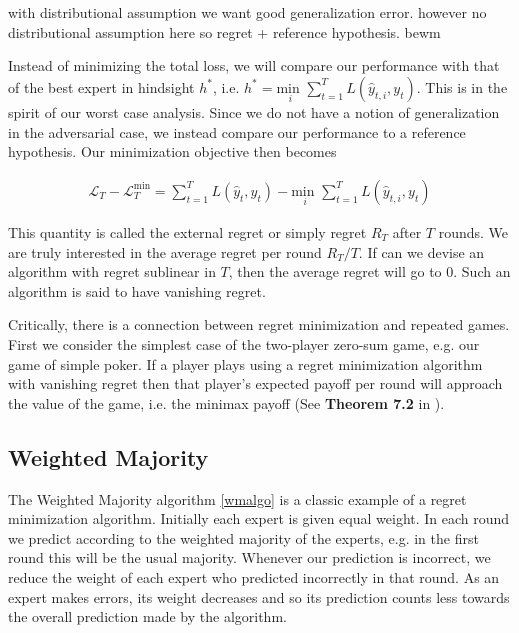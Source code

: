 \documentclass{article}
\begin{document}
with distributional assumption we want good generalization error. however no distributional assumption here so regret + reference hypothesis. bewm

Instead of minimizing the total loss, we will compare our performance with that of the best expert in hindsight $h^*$, i.e. $h^* = \underset{i}{\text{min }} \sum_{t=1}^T L(\hat y_{t,i}, y_t)$. This is in the spirit of our worst case analysis. Since we do not have a notion of generalization in the adversarial case, we instead compare our performance to a reference hypothesis. Our minimization objective then becomes

\begin{align*}
\mathcal{L}_T - \mathcal{L}_T^{\text{min}} = \sum_{t=1}^T L(\hat y_t, y_t) - \underset{i}{\text{min }} \sum_{t=1}^T L(\hat y_{t,i}, y_t)
\end{align*}

This quantity is called the external regret or simply regret $R_T$ after $T$ rounds. We are truly interested in the average regret per round $R_T/T$. If can we devise an algorithm with regret sublinear in $T$, then the average regret will go to 0. Such an algorithm is said to have vanishing regret.

Critically, there is a connection between regret minimization and repeated games. First we consider the simplest case of the two-player zero-sum game, e.g. our game of simple poker. If a player plays using a regret minimization algorithm with vanishing regret then that player's expected payoff per round will approach the value of the game, i.e. the minimax payoff (See \textbf{Theorem 7.2} in \cite{cesa2006prediction}).

\subsection{Weighted Majority}

The Weighted Majority algorithm \autoref{wmalgo} \cite{littlestone1994weighted} is a classic example of a regret minimization algorithm. Initially each expert is given equal weight. In each round we predict according to the weighted majority of the experts, e.g. in the first round this will be the usual majority. Whenever our prediction is incorrect, we reduce the weight of each expert who predicted incorrectly in that round. As an expert makes errors, its weight decreases and so its prediction counts less towards the overall prediction made by the algorithm.
\end{document}

